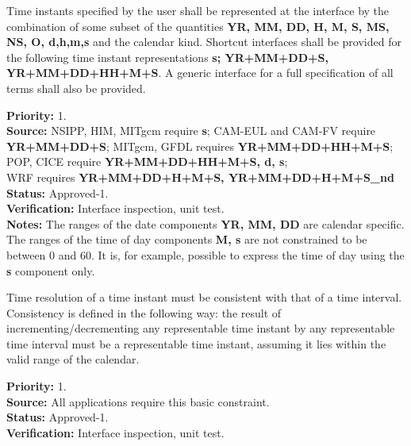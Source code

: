 Time instants specified by the user shall be represented at the interface by the 
combination of some subset of the quantities {\bf YR, MM, DD, H, M, S, MS, NS, O,
d,h,m,s} 
and the calendar kind.  Shortcut interfaces shall be provided for the following time 
instant representations {\bf s; YR+MM+DD+S, YR+MM+DD+HH+M+S}. A generic interface for a 
full specification of all terms shall also be provided.
\begin{reqlist}
{\bf Priority:} 1. \\
{\bf Source:} NSIPP, HIM, MITgcm require {\bf s}; 
CAM-EUL and CAM-FV require {\bf YR+MM+DD+S};
MITgcm, GFDL requires {\bf YR+MM+DD+HH+M+S}; 
POP, CICE require {\bf YR+MM+DD+HH+M+S, d, s}; \\
WRF requires {\bf YR+MM+DD+H+M+S, YR+MM+DD+H+M+S\_nd} \\
{\bf Status:} Approved-1. \\
{\bf Verification:} Interface inspection, unit test. \\
{\bf Notes:} The ranges of the date components {\bf YR, MM, DD} are
calendar specific.  The ranges of the time of day components {\bf M, s} are
not constrained to be between 0 and 60.  It is, for example, possible to
express the time of day using the {\bf s} component only.  
\end{reqlist}

Time resolution of a time instant must be consistent with that of a time interval.
Consistency is defined in the following way:  the result of incrementing/decrementing 
any representable time instant by any representable time interval must be a representable 
time instant, assuming it lies within the valid range of the calendar.
\begin{reqlist}
{\bf Priority:} 1. \\
{\bf Source:} All applications require this basic constraint.\\
{\bf Status:} Approved-1. \\
{\bf Verification:} Interface inspection, unit test. 
\end{reqlist}

\label{req:calendar}

